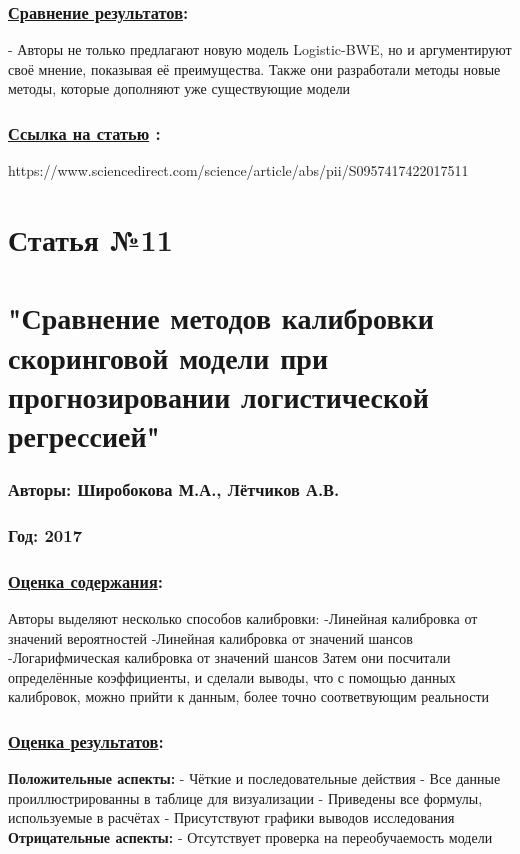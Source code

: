 \documentclass[a4paper,14pt]{article}
\begin{document}
\subsubsection*{\underline{Сравнение результатов}:}
- Авторы не только предлагают новую модель Logistic-BWE, но и аргументируют своё мнение, показывая её преимущества. Также они разработали методы новые методы, которые дополняют уже существующие модели
\subsubsection*{\underline{Ссылка на статью} :}
https://www.sciencedirect.com/science/article/abs/pii/S0957417422017511


\newpage



\section*{Статья №11}
\section*{"Сравнение методов калибровки скоринговой модели при прогнозировании логистической регрессией"}
\subsubsection*{Авторы: Широбокова М.А., Лётчиков А.В.}
\subsubsection*{Год: 2017}
\subsubsection*{\underline{Оценка содержания}:}
Авторы выделяют несколько способов калибровки:\newline
-Линейная калибровка от значений вероятностей\newline
-Линейная калибровка от значений шансов\newline
-Логарифмическая калибровка от значений шансов\newline
Затем они посчитали определённые коэффициенты, и сделали выводы, что с помощью данных калибровок, можно прийти к данным, более точно соответвующим реальности
\subsubsection*{\underline{Оценка результатов}:}
\textbf{Положительные аспекты:} \newline
- Чёткие и последовательные действия \newline
- Все данные проиллюстрированны в таблице для визуализации \newline
- Приведены все формулы, используемые в расчётах \newline
- Присутствуют графики выводов исследования \newline
\textbf{Отрицательные аспекты:} \newline
- Отсутствует проверка на переобучаемость модели \newline
\end{document}

